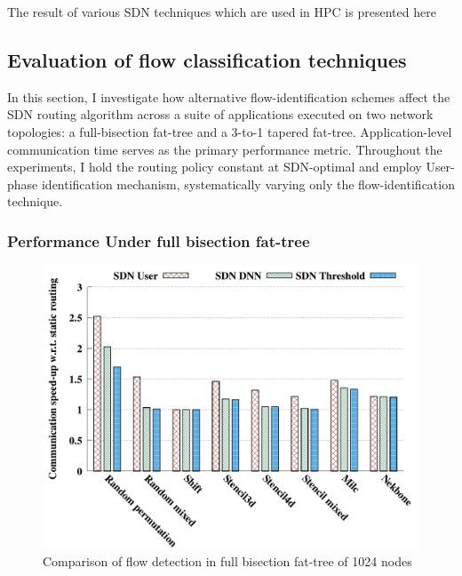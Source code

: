 The result of various SDN techniques which are used in HPC is presented here

\subsection{Evaluation of flow classification techniques}

In this section, I investigate how alternative flow-identification schemes affect the SDN routing algorithm across a suite of applications executed on two network topologies: a full-bisection fat-tree and a 3-to-1 tapered fat-tree. Application-level communication time serves as the primary performance metric. Throughout the experiments, I hold the routing policy constant at SDN-optimal and employ User-phase identification mechanism, systematically varying only the flow-identification technique.

\subsubsection{Performance Under full bisection fat-tree}
\begin{figure}[h]
  \centering
  \includegraphics[width=\columnwidth]{./figs_4/full_fat_flow_detection.pdf}
  \caption{Comparison of flow detection in full bisection fat-tree of 1024 nodes}
  \label{fig:fld_full}
\end{figure}

